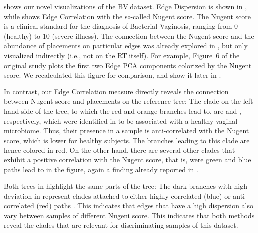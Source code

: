  shows our novel visualizations of the \ac{BV} dataset.
Edge Dispersion is shown in ,
while  shows Edge Correlation with the so-called Nugent score. %
The Nugent score \cite{Nugent1991} is a clinical standard for the diagnosis of Bacterial Vaginosis,
ranging from \num{0} (healthy) to \num{10} (severe illness).
The connection between the Nugent score and the abundance of placements on particular edges
was already explored in \cite{Matsen2011a}, but only visualized indirectly (i.e., not on the \ac{RT} itself).
For example, Figure~6 of the original study plots the first two Edge PCA components colorized by the Nugent score.
We recalculated this figure for comparison, and show it later in .

In contrast, our Edge Correlation measure directly reveals
the connection between Nugent score and placements on the reference tree:
The clade on the left hand side of the tree, to which the red and orange branches lead to,
are  and , respectively,
which were identified in \cite{Srinivasan2012} to be associated with a healthy vaginal microbiome.
Thus, their presence in a sample is anti-correlated with the Nugent score, which is lower for healthy subjects.
The branches leading to this clade are hence colored in red.
On the other hand, there are several other clades that exhibit a positive correlation with the Nugent score,
that is, were green and blue paths lead to in the figure,
again a finding already reported in \cite{Srinivasan2012}.

Both trees in  highlight the same parts of the tree:
The dark branches with high deviation in  represent clades
attached to either highly correlated (blue) or anti-correlated (red) paths .
This indicates that edges that have a high dispersion
also vary between samples of different Nugent score.
This indicates that both methods reveal the clades that are relevant for discriminating samples of this dataset.

